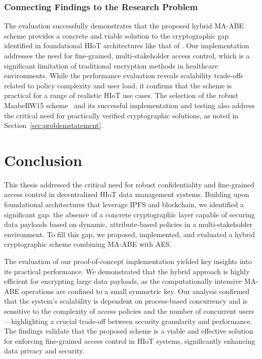 \documentclass[cic,tc,english]{iiufrgs}
\numberwithin{algorithm}{chapter}
\begin{document}
            \subsection{Connecting Findings to the Research Problem}

                The evaluation successfully demonstrates that the proposed hybrid MA-ABE scheme provides a concrete and viable solution to the cryptographic gap identified in foundational HIoT architectures like that of \citet{laura2023}. Our implementation addresses the need for fine-grained, multi-stakeholder access control, which is a significant limitation of traditional encryption methods in healthcare environments. While the performance evaluation reveals scalability trade-offs related to policy complexity and user load, it confirms that the scheme is practical for a range of realistic HIoT use cases. The selection of the robust MaabeRW15 scheme~\citep{rouselakis2015efficient} and its successful implementation and testing also address the critical need for practically verified cryptographic solutions, as noted in Section~\ref{sec:problemstatement}.


\chapter{Conclusion}
    \label{chap:conclusion}

    This thesis addressed the critical need for robust confidentiality and fine-grained access control in decentralized HIoT data management systems. Building upon foundational architectures that leverage IPFS and blockchain, we identified a significant gap: the absence of a concrete cryptographic layer capable of securing data payloads based on dynamic, attribute-based policies in a multi-stakeholder environment. To fill this gap, we proposed, implemented, and evaluated a hybrid cryptographic scheme combining MA-ABE with AES.

    The evaluation of our proof-of-concept implementation yielded key insights into its practical performance. We demonstrated that the hybrid approach is highly efficient for encrypting large data payloads, as the computationally intensive MA-ABE operations are confined to a small symmetric key. Our analysis confirmed that the system's scalability is dependent on process-based concurrency and is sensitive to the complexity of access policies and the number of concurrent users—highlighting a crucial trade-off between security granularity and performance. The findings validate that the proposed scheme is a viable and effective solution for enforcing fine-grained access control in HIoT systems, significantly enhancing data privacy and security.
\end{document}
